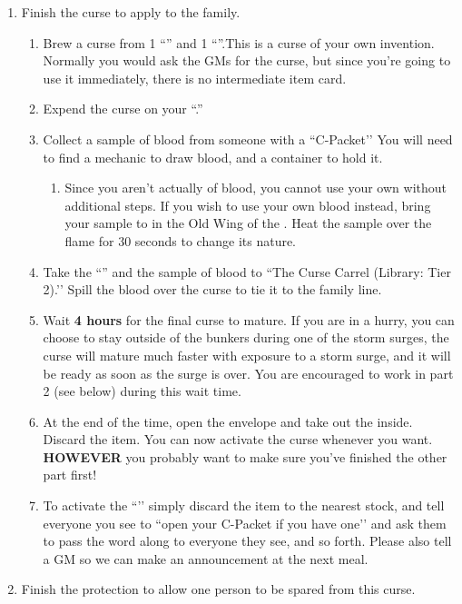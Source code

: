\documentclass[green]{GL2020}
\begin{document}
\begin{enumerate}
  \item Finish the curse to apply to the \cAdopted{\formal} family.
  \begin{enumerate}    \item Brew a curse from 1 ``\iFlameOrchid{}'' and 1 ``\iObsidian{}''.This is a curse of your own invention. Normally you would ask the GMs for the curse, but since you're going to use it immediately, there is no intermediate item card.
    \item Expend the curse on your ``\iWIPCurse{}.''
    \item Collect a sample of blood from someone with a ``C-Packet’’ You will need to find a mechanic to draw blood, and a container to hold it. 
  \begin{enumerate}
    \item Since you aren’t actually of \cMusic{\formal} blood, you cannot use your own without additional steps. If you wish to use your own blood instead, bring your sample to \sPFlameTwo{} in the Old Wing of the \pSc{}. Heat the sample over the flame for 30 seconds to change its nature.
  \end{enumerate}
    \item Take the ``\iWIPCurse{}'' and the sample of blood to ``The Curse Carrel (Library: Tier 2).’’ Spill the blood over the curse to tie it to the \cAdopted{\formal} family line.
    \item Wait \textbf{4 hours} for the final curse to mature. If you are in a hurry, you can choose to stay outside of the bunkers during one of the storm surges, the curse will mature much faster with exposure to a storm surge, and it will be ready as soon as the surge is over. You are encouraged to work in part 2 (see below) during this wait time.
    \item At the end of the time, open the \iWIPCurse{} envelope and take out the \iWithering{} inside. Discard the \iWIPCurse{} item. You can now activate the curse whenever you want. \textbf{HOWEVER} you probably want to make sure you’ve finished the other part first!
    \item To activate the ``\iWithering{}’’ simply discard the item to the nearest stock, and tell everyone you see to ``open your C-Packet if you have one’’ and ask them to pass the word along to everyone they see, and so forth. Please also tell a GM so we can make an announcement at the next meal.
  \end{enumerate}
  \item Finish the protection to allow one person to be spared from this curse.

\end{enumerate}
\end{document}
